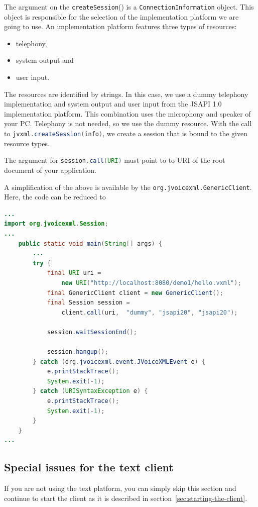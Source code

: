 \documentclass[11pt,a4paper]{book}
\begin{document}
The argument on the \lstinline[language=Java]{createSession}() is a
\lstinline[language=Java]{ConnectionInformation} object. This object is
responsible for the selection of the implementation platform we are going to
use. An implementation platform features three types of resources:
\begin{itemize}
  \item telephony,
  \item system output and
  \item user input.
\end{itemize}
The resources are identified by strings. In this case, we use a dummy telephony
implementation and system output and user input from the JSAPI 1.0
implementation platform. This combination uses the microphony and speaker of
your PC. Telephony is not needed, so we use the dummy resource. With the call to
\lstinline[language=Java]{jvxml.createSession(info)}, we create a session that
is bound to the given resource types.

The argument for \lstinline[language=Java]{session.call(URI)} must point to to URI of the
root document of your application.

A simplification of the above is available by the
\lstinline{org.jvoicexml.GenericClient}. Here, the code can be reduced to

\begin{lstlisting}[language=Java]
...
import org.jvoicexml.Session;
...
    public static void main(String[] args) {
        ...
        try {
            final URI uri = 
                new URI("http://localhost:8080/demo1/hello.vxml");
            final GenericClient client = new GenericClient();
            final Session session =
                client.call(uri,  "dummy", "jsapi20", "jsapi20");

            session.waitSessionEnd();

            session.hangup();
        } catch (org.jvoicexml.event.JVoiceXMLEvent e) {
            e.printStackTrace();
            System.exit(-1);
        } catch (URISyntaxException e) {
            e.printStackTrace();
            System.exit(-1);
        }
    }
...
\end{lstlisting}

\subsection{Special issues for the text client}

If you are not using the text platform, you can simply skip this section and
continue to start the client as it is described in
section~\ref{sec:starting-the-client}.
\end{document}
